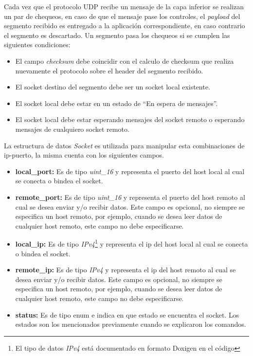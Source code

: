 \documentclass[10pt,a4paper]{article}
\begin{document}
Cada vez que el protocolo UDP recibe un mensaje de la capa inferior se realizan un par de chequeos, en caso de que el mensaje pase los controles, el \textit{payload} del segmento recibido es entregado a la aplicación correspondiente, en caso contrario el segmento es descartado. Un segmento pasa los chequeos si se cumplen las siguientes condiciones:

\begin{itemize}
\item El campo \textit{checksum} debe coincidir con el calculo de checksum que realiza nuevamente el protocolo sobre el header del segmento recibido.
\item El socket destino del segmento debe ser un socket local existente.
\item El socket local debe estar en un estado de ``En espera de mensajes''.
\item El socket local debe estar esperando mensajes del socket remoto o esperando mensajes de cualquiero socket remoto.
\end{itemize}

La estructura de datos \textit{Socket} es utilizada para manipular esta combinaciones de ip-puerto, la misma cuenta con los siguientes campos.

\begin{itemize}
\item \textbf{local_port: } Es de tipo \textit{uint_16} y representa el puerto del host local al cual se conecta o bindea el socket.
\item \textbf{remote_port: } Es de tipo \textit{uint_16} y representa el puerto del host remoto al cual se desea enviar y/o recibir datos. Este campo es opcional, no siempre se especifica un host remoto, por ejemplo, cuando se desea leer datos de cualquier host remoto, este campo no debe especificarse.
\item \textbf{local_ip: } Es de tipo \textit{IPv4}\footnote{El tipo de datos \textit{IPv4} está documentado en formato Doxigen en el código} y representa el ip del host local al cual se conecta o bindea el socket.
\item \textbf{remote_ip: } Es de tipo \textit{IPv4} y representa el ip del host remoto al cual se desea enviar y/o recibir datos. Este campo es opcional, no siempre se especifica un host remoto, por ejemplo, cuando se desea leer datos de cualquier host remoto, este campo no debe especificarse.
\item \textbf{status: } Es de tipo enum e indica en que estado se encuentra el socket. Los estados son los mencionados previamente cuando se explicaron los comandos.
\end{itemize}
\end{document}
